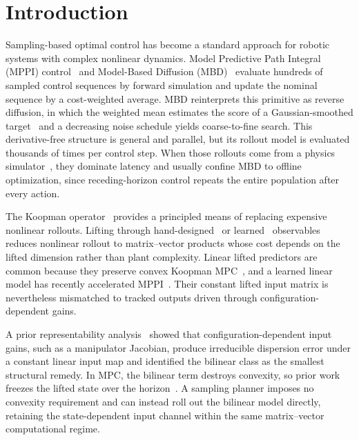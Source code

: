 \documentclass[letterpaper,10pt,conference]{ieeeconf}
\begin{document}
\section{Introduction}\label{sec:intro}
Sampling-based optimal control has become a standard approach for robotic systems with complex nonlinear dynamics.
Model Predictive Path Integral (MPPI) control~\cite{kappen2005, theodorou2010, williams2017mppi, williams2016aggressive} and Model-Based Diffusion (MBD)~\cite{pan2024model, xue2025full} evaluate hundreds of sampled control sequences by forward simulation and update the nominal sequence by a cost-weighted average.
MBD reinterprets this primitive as reverse diffusion, in which the weighted mean estimates the score of a Gaussian-smoothed target~\cite{song2019generative, song2020score} and a decreasing noise schedule yields coarse-to-fine search.
This derivative-free structure is general and parallel, but its rollout model is evaluated thousands of times per control step.
When those rollouts come from a physics simulator~\cite{pan2024model}, they dominate latency and usually confine MBD to offline optimization, since receding-horizon control repeats the entire population after every action.

The Koopman operator~\cite{koopman1931, mezic2005} provides a principled means of replacing expensive nonlinear rollouts.
Lifting through hand-designed~\cite{williams2015edmd, proctor2016dmdc} or learned~\cite{lusch2018deep} observables reduces nonlinear rollout to matrix--vector products whose cost depends on the lifted dimension rather than plant complexity.
Linear lifted predictors are common because they preserve convex Koopman MPC~\cite{korda2018mpc, strasser2026}, and a learned linear model has recently accelerated MPPI~\cite{mppidk2026}.
Their constant lifted input matrix is nevertheless mismatched to tracked outputs driven through configuration-dependent gains.

A prior representability analysis~\cite{kim2026bilinear} showed that configuration-dependent input gains, such as a manipulator Jacobian, produce irreducible dispersion error under a constant linear input map and identified the bilinear class as the smallest structural remedy.
In MPC, the bilinear term destroys convexity, so prior work freezes the lifted state over the horizon~\cite{bruder2021bilinear}.
A sampling planner imposes no convexity requirement and can instead roll out the bilinear model directly, retaining the state-dependent input channel within the same matrix--vector computational regime.
\end{document}
